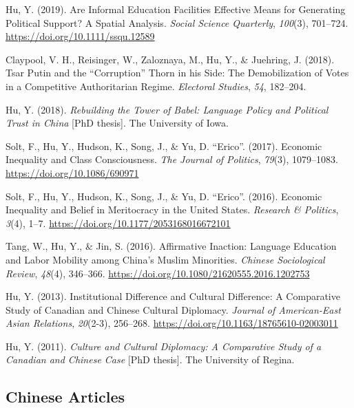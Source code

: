 \documentclass[11pt,a4paper,]{awesome-cv}
\begin{document}
\leavevmode{}%
Hu, Y. (2019). Are Informal Education Facilities Effective Means for
Generating Political Support? A Spatial Analysis. \emph{Social Science
Quarterly}, \emph{100}(3), 701--724.
\url{https://doi.org/10.1111/ssqu.12589}

\leavevmode{}%
Claypool, V. H., Reisinger, W., Zaloznaya, M., Hu, Y., \& Juehring, J.
(2018). Tsar Putin and the {``Corruption''} Thorn in his Side: The
Demobilization of Votes in a Competitive Authoritarian Regime.
\emph{Electoral Studies}, \emph{54}, 182--204.

\leavevmode{}%
Hu, Y. (2018). \emph{Rebuilding the Tower of Babel: Language Policy and
Political Trust in China} {[}PhD thesis{]}. The University of Iowa.

\leavevmode{}%
Solt, F., Hu, Y., Hudson, K., Song, J., \& Yu, D. ``Erico''. (2017).
Economic Inequality and Class Consciousness. \emph{The Journal of
Politics}, \emph{79}(3), 1079--1083.
\url{https://doi.org/10.1086/690971}

\leavevmode{}%
Solt, F., Hu, Y., Hudson, K., Song, J., \& Yu, D. ``Erico''. (2016).
Economic Inequality and Belief in Meritocracy in the United States.
\emph{Research \& Politics}, \emph{3}(4), 1--7.
\url{https://doi.org/10.1177/2053168016672101}

\leavevmode{}%
Tang, W., Hu, Y., \& Jin, S. (2016). Affirmative Inaction: Language
Education and Labor Mobility among China's Muslim Minorities.
\emph{Chinese Sociological Review}, \emph{48}(4), 346--366.
\url{https://doi.org/10.1080/21620555.2016.1202753}

\leavevmode{}%
Hu, Y. (2013). Institutional Difference and Cultural Difference: A
Comparative Study of Canadian and Chinese Cultural Diplomacy.
\emph{Journal of American-East Asian Relations}, \emph{20}(2-3),
256--268. \url{https://doi.org/10.1163/18765610-02003011}

\leavevmode{}%
Hu, Y. (2011). \emph{Culture and Cultural Diplomacy: A Comparative Study
of a Canadian and Chinese Case} {[}PhD thesis{]}. The University of
Regina.

\endgroup

\hypertarget{chinese-articles}{%
\subsection{Chinese Articles}\label{chinese-articles}}
\end{document}
